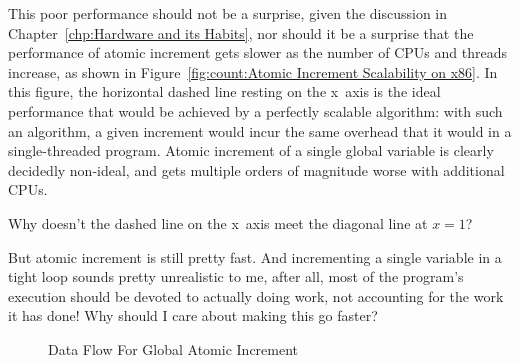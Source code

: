 This poor performance should not be a surprise, given the discussion in
Chapter~\ref{chp:Hardware and its Habits},
nor should it be a surprise that the performance of atomic increment
gets slower as the number of CPUs and threads increase, as shown in
Figure~\ref{fig:count:Atomic Increment Scalability on x86}.
In this figure, the horizontal dashed line resting on the x~axis
is the ideal performance that would be achieved
by a perfectly scalable algorithm: with such an algorithm, a given
increment would incur the same overhead that it would in a single-threaded
program.
Atomic increment of a single global variable is clearly
decidedly non-ideal, and gets multiple orders of magnitude worse with
additional CPUs.

\QuickQuiz{}
	Why doesn't the dashed line on the x~axis meet the
	diagonal line at $x=1$?
 \QuickQuizEnd

\QuickQuiz{}
	But atomic increment is still pretty fast.
	And incrementing a single variable in a tight loop sounds
	pretty unrealistic to me, after all, most of the program's
	execution should be devoted to actually doing work, not accounting
	for the work it has done!
	Why should I care about making this go faster?
 \QuickQuizEnd

\begin{figure}[tb]
\centering
{}
\caption{Data Flow For Global Atomic Increment}
\label{fig:count:Data Flow For Global Atomic Increment}
\end{figure}

